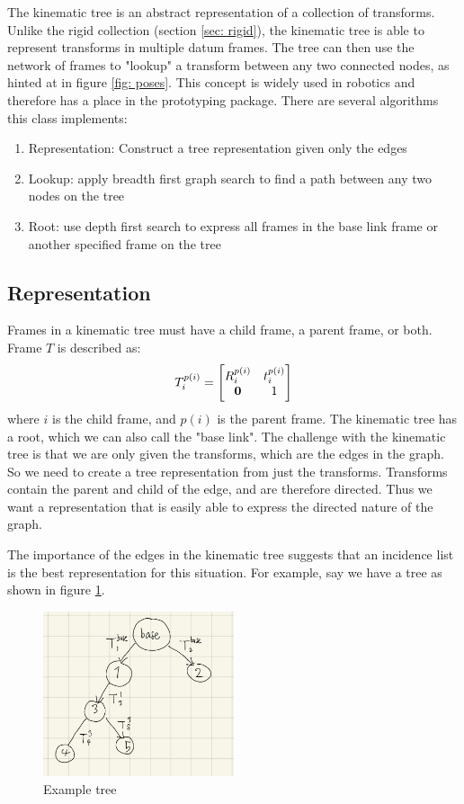 The kinematic tree is an abstract representation of a collection of transforms. 
Unlike the rigid collection (section \ref{sec: rigid}), the kinematic tree is able to represent transforms in multiple datum frames. 
The tree can then use the network of frames to "lookup" a transform between any two connected nodes, as hinted at in figure \ref{fig: poses}.
This concept is widely used in robotics and therefore has a place in the prototyping package. 
There are several algorithms this class implements:
\begin{enumerate}
	\item Representation: Construct a tree representation given only the edges
	\item Lookup: apply breadth first graph search to find a path between any two nodes on the tree
	\item Root: use depth first search to express all frames in the base link frame or another specified frame on the tree
\end{enumerate}

\subsection{Representation}
Frames in a kinematic tree must have a child frame, a parent frame, or both. 
Frame $T$ is described as:
\begin{equation}
	T_i^{p(i)} = \begin{bmatrix}
		R_i^{p(i)} & t_i^{p(i)} \\
		\bf{0} & 1
	\end{bmatrix}
\end{equation}
where $i$ is the child frame, and $p(i)$ is the parent frame. 
The kinematic tree has a root, which we can also call the "base link". 
The challenge with the kinematic tree is that we are only given the transforms, which are the edges in the graph. 
So we need to create a tree representation from just the transforms. 
Transforms contain the parent and child of the edge, and are therefore directed. 
Thus we want a representation that is easily able to express the directed nature of the graph. 

The importance of the edges in the kinematic tree suggests that an incidence list is the best representation for this situation. 
For example, say we have a tree as shown in figure \ref{fig: tree}.

\begin{figure}
	\centering
	\includegraphics[width=0.5\textwidth]{images/example_tree.png}
	\caption{Example tree}
	\label{fig: tree}
\end{figure}

